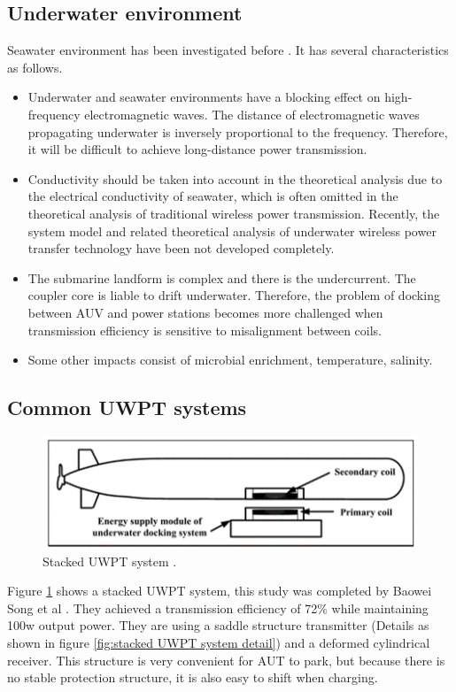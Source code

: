 \subsection{Underwater environment}
Seawater environment has been investigated before \cite{Shaw2006, Orekan, Taormina2018}. It has several characteristics as follows.
\begin{itemize}
    \item Underwater and seawater environments have a blocking effect on high-frequency electromagnetic waves. 
    The distance of electromagnetic waves propagating underwater is inversely proportional to the frequency.
    Therefore, it will be difficult to achieve long-distance power transmission.
    \item Conductivity should be taken into account in the theoretical analysis due to the electrical conductivity of seawater, which is often omitted in the theoretical analysis of traditional wireless power transmission. 
    Recently, the system model and related theoretical analysis of underwater wireless power transfer technology have been not developed completely.
    \item The submarine landform is complex and there is the undercurrent. 
    The coupler core is liable to drift underwater.
    Therefore, the problem of docking between AUV and power stations becomes more challenged when transmission efficiency is sensitive to misalignment between coils.
    \item Some other impacts consist of microbial enrichment, temperature, salinity.
\end{itemize}

\subsection{Common UWPT systems}

\begin{figure}[!b]
    \centering
    \includegraphics[width=0.7\linewidth]{images/1_stacked_UWPT_system.png}
    \caption{Stacked UWPT system \cite{Song}.}
    \label{fig:stacked UWPT system}
\end{figure}
Figure \ref{fig:stacked UWPT system} shows a stacked UWPT system, this study was completed by Baowei Song et al \cite{Song}. They achieved a transmission efficiency of 72\% while maintaining 100w output power.
They are using a saddle structure transmitter (Details as shown in figure \ref{fig:stacked UWPT system detail}) and a deformed cylindrical receiver. This structure is very convenient for AUT to park, but because there is no stable protection structure, it is also easy to shift when charging.

